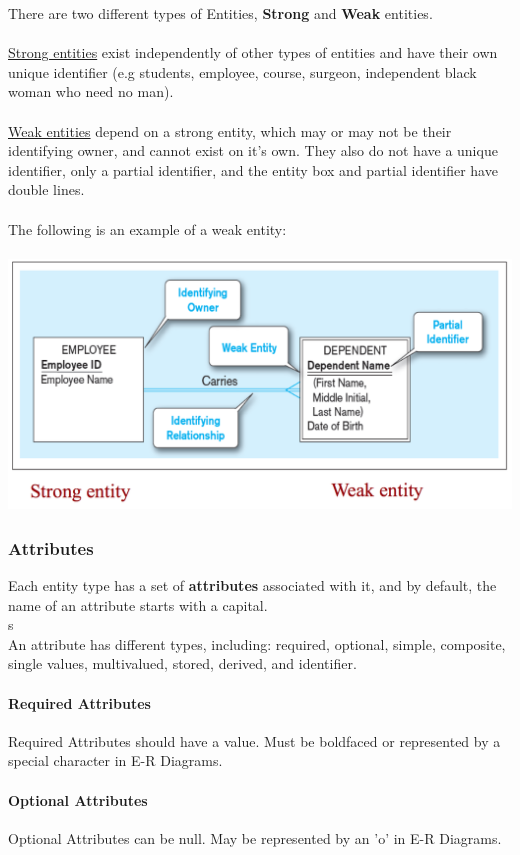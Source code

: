 \documentclass[12pt]{article}
\begin{document}
There are two different types of Entities, \textbf{Strong} and \textbf{Weak} entities.\\
\\
\underline{Strong entities} exist independently of other types of entities and have their own unique identifier (e.g students, employee, course, surgeon, independent black woman who need no man).\\
\\
\underline{Weak entities} depend on a strong entity, which may or may not be their identifying owner, and cannot exist on it's own. They also do not have a unique identifier, only a partial identifier, and the entity box and partial identifier have double lines.\\
\\
The following is an example of a weak entity:\\
\\
\includegraphics[scale=0.5]{lec2-4}

\subsubsection{Attributes}

Each entity type has a set of \textbf{attributes} associated with it, and by default, the name of an attribute starts with a capital.\\s
\\
An attribute has different types, including: required, optional, simple, composite, single values, multivalued, stored, derived, and identifier.
\paragraph{Required Attributes} Required Attributes should have a value. Must be boldfaced or represented by a special character in E-R Diagrams.

\paragraph{Optional Attributes} Optional Attributes can be null. May be represented by an 'o' in E-R Diagrams.
\end{document}
